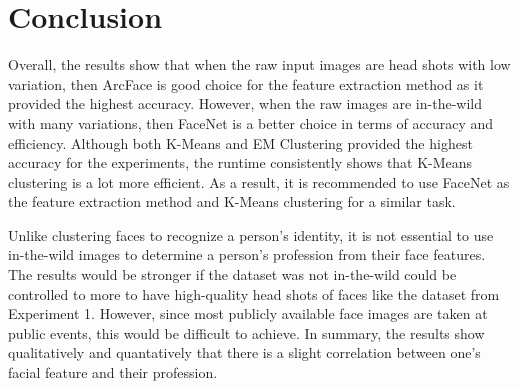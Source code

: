 \documentclass[12pt,english]{article}
\begin{document}
\section{Conclusion}
\quad
Overall, the results show that when the raw input images are head shots with low variation, then ArcFace is good choice for the feature extraction method as it provided the highest accuracy. However, when the raw images are in-the-wild with many variations, then FaceNet is a better choice in terms of accuracy and efficiency.  Although both K-Means and EM Clustering provided the highest accuracy for the experiments, the runtime consistently shows that K-Means clustering is a lot more efficient. As a result, it is recommended to use FaceNet as the feature extraction method and K-Means clustering for a similar task. 

Unlike clustering faces to recognize a person’s identity, it is not essential to use in-the-wild images to determine a person’s profession from their face features. The results would be stronger if the dataset was not in-the-wild could be controlled to more to have high-quality head shots of faces like the dataset from Experiment 1. However, since most publicly available face images are taken at public events, this would be difficult to achieve.  In summary, the results show qualitatively and quantatively that there is a slight correlation between one’s facial feature and their profession. 
\end{document}
